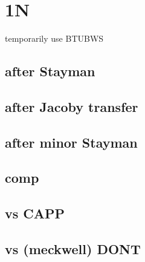 \section{1N}

temporarily use BTUBWS


\subsection{after Stayman}


\subsection{after Jacoby transfer}


\subsection{after minor Stayman}


\subsection{comp}


\subsection{vs CAPP}


\subsection{vs (meckwell) DONT}



